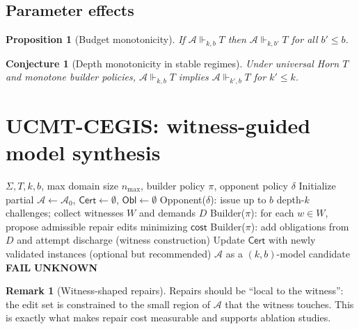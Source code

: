 \documentclass[11pt]{article}
\theoremstyle{definition}
\newtheorem{remark}{Remark}[section]
\theoremstyle{plain}
\newtheorem{proposition}[definition]{Proposition}
\newtheorem{conjecture}[definition]{Conjecture}
\newcommand{\Sig}{\Sigma}
\newcommand{\Thy}{T}
\newcommand{\Struct}{\mathcal{A}}
\newcommand{\Univ}{\left|\Struct\right|}
\newcommand{\kbforces}{\Vdash_{k,b}}      %
\newcommand{\cost}{\mathsf{cost}}
\newcommand{\Cert}{\mathsf{Cert}}
\newcommand{\Obl}{\mathsf{Obl}}
\begin{document}
\subsection{Parameter effects}

\begin{proposition}[Budget monotonicity]
If $\Struct \kbforces \Thy$ then $\Struct \Vdash_{k,b'} \Thy$ for all $b'\le b$.
\end{proposition}

\begin{conjecture}[Depth monotonicity in stable regimes]
Under universal Horn $\Thy$ and monotone builder policies, $\Struct \kbforces \Thy$ implies $\Struct \Vdash_{k',b}\Thy$
for $k'\le k$.
\end{conjecture}

\section{UCMT-CEGIS: witness-guided model synthesis}

\begin{algorithm}[h]
\caption{UCMT-CEGIS (witness-guided synthesis)}
\begin{algorithmic}[1]
\Require $\Sig,\Thy,k,b$, max domain size $n_{\max}$, builder policy $\pi$, opponent policy $\delta$
\State Initialize partial $\Struct \gets \Struct_0$, $\Cert\gets\emptyset$, $\Obl\gets\emptyset$
  \State Opponent($\delta$): issue up to $b$ depth-$k$ challenges; collect witnesses $W$ and demands $D$
  \State Builder($\pi$): for each $w\in W$, propose admissible repair edits minimizing $\cost$
  \State Builder($\pi$): add obligations from $D$ and attempt discharge (witness construction)
  \State Update $\Cert$ with newly validated instances (optional but recommended)
  \If{$W=\emptyset$ and $\Obl=\emptyset$}
     \State \Return $\Struct$ as a $(k,b)$-model candidate
  \EndIf
  \If{$\Univ>n_{\max}$} \State \Return \textbf{FAIL} \EndIf
\EndFor
\State \Return \textbf{UNKNOWN}
\end{algorithmic}
\end{algorithm}

\begin{remark}[Witness-shaped repairs]
Repairs should be ``local to the witness'': the edit set is constrained to the small region of $\Struct$
that the witness touches. This is exactly what makes repair cost measurable and supports ablation studies.
\end{remark}
\end{document}
